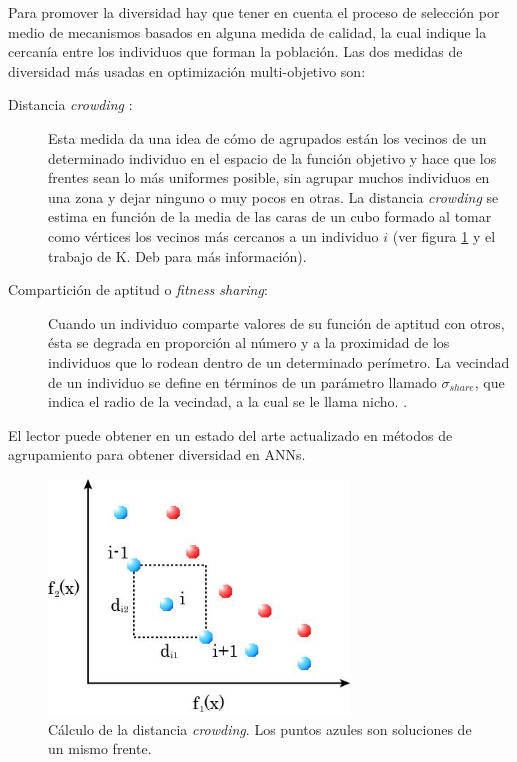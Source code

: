 Para promover la diversidad hay que tener en cuenta el proceso de selección por medio de
mecanismos basados en alguna medida de calidad, la cual indique la cercanía entre los
individuos que forman la población. Las dos medidas de diversidad más usadas en
optimización multi-objetivo son:
\begin{description}
	\item[Distancia \textit{crowding} \cite{Deb2002}:] Esta medida da una idea de cómo de
agrupados están los vecinos de un determinado individuo en el espacio de la función
objetivo y hace que los frentes sean lo más uniformes posible, sin agrupar muchos
individuos en una
zona y dejar ninguno o muy pocos en otras. La distancia \textit{crowding} se estima en función
de la media de las caras de un cubo formado al tomar como vértices los vecinos más
cercanos a un
individuo $i$ (ver figura \ref{figuraCrowding} y el trabajo de K. Deb \cite{Deb2002} para más
información).
	\item[Compartición de aptitud o \textit{fitness sharing}:] Cuando un individuo
comparte valores de su función de aptitud con otros, ésta se degrada en proporción al número y
a la
proximidad de los individuos que lo rodean dentro de un determinado perímetro. La vecindad
de un individuo se define en términos de un parámetro llamado $\sigma_{share}$, que
indica el radio de la vecindad, a la cual se le llama nicho.
\cite{Golberg1989,Sareni1998}.
\end{description}

El lector puede obtener en \cite{Du2010} un estado del arte actualizado en métodos de
agrupamiento para obtener diversidad en ANNs.

\begin{figure}[!htp]
\centering
\includegraphics[keepaspectratio,width=8cm]{figuras/CrowdingDistance.jpg}
\caption{Cálculo de la distancia \textit{crowding}. Los puntos azules son soluciones de un mismo
frente.}
\label{figuraCrowding}
\end{figure}

